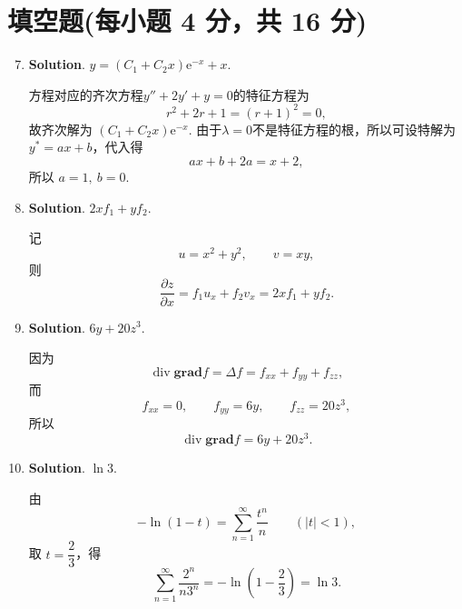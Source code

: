 \documentclass[../main.tex]{subfiles}
\begin{document}
\section{填空题(每小题 4 分，共 16 分)}
\begin{enumerate}
    \setcounter{enumi}{6}
    \item \textbf{Solution}. $y=(C_1+C_2x)\mathrm{e}^{-x}+x$.

          方程对应的齐次方程$y''+2y'+y=0$的特征方程为
          \[
              r^2+2r+1=(r+1)^2=0,
          \]
          故齐次解为 \((C_1+C_2x)\mathrm{e}^{-x}\). 由于$\lambda=0$不是特征方程的根，所以可设特解为 \(y^*=ax+b\)，代入得
          \[
              ax+b+2a=x+2,
          \]
          所以 \(a=1,\ b=0\).

    \item \textbf{Solution}. $2xf_{1}+yf_{2}$.

          记
          \[
              u=x^2+y^2,\qquad v=xy,
          \]
          则
          \[
              \frac{\partial z}{\partial x}=f_1u_x+f_2v_x=2xf_1+yf_2.
          \]

    \item \textbf{Solution}. $6y+20z^{3}$.

          因为
          \[
              \operatorname{div}\mathbf{grad}f=\Delta f=f_{xx}+f_{yy}+f_{zz},
          \]
          而
          \[
              f_{xx}=0,\qquad f_{yy}=6y,\qquad f_{zz}=20z^3,
          \]
          所以
          \[
              \operatorname{div}\mathbf{grad}f=6y+20z^3.
          \]

    \item \textbf{Solution}. $\ln3$.

          由
          \[
              -\ln(1-t)=\sum_{n=1}^{\infty}\frac{t^n}{n}\qquad(|t|<1),
          \]
          取 \(t=\dfrac23\)，得
          \[
              \sum_{n=1}^{\infty}\frac{2^n}{n3^n}
              =-\ln\left(1-\frac23\right)=\ln3.
          \]

\end{enumerate}
\end{document}
